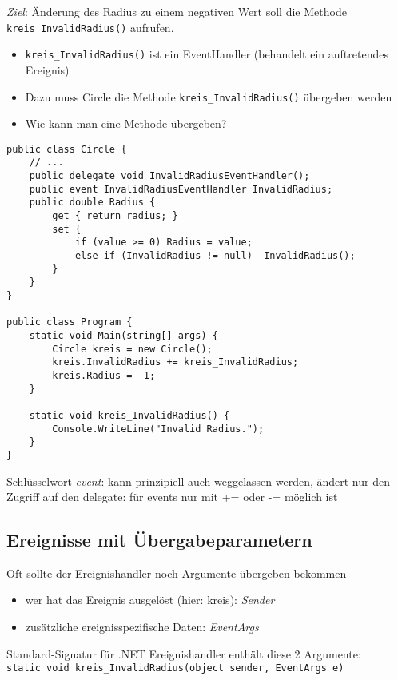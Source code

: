 \emph{Ziel}: Änderung des Radius zu einem negativen Wert soll die Methode \lstinline$kreis_InvalidRadius()$ aufrufen.

\begin{itemize}
\item \lstinline$kreis_InvalidRadius()$ ist ein EventHandler (behandelt ein auftretendes Ereignis)
\item Dazu muss Circle die Methode \lstinline$kreis_InvalidRadius()$ übergeben werden
\item Wie kann man eine Methode übergeben? 
\end{itemize}

\begin{lstlisting}[language={[Sharp]C}]
public class Circle {
	// ...
	public delegate void InvalidRadiusEventHandler();
	public event InvalidRadiusEventHandler InvalidRadius;
	public double Radius {
		get { return radius; }
		set {
			if (value >= 0) Radius = value;
			else if (InvalidRadius != null)  InvalidRadius();
		}
	}
}

public class Program {  
	static void Main(string[] args) {
		Circle kreis = new Circle();
		kreis.InvalidRadius += kreis_InvalidRadius;
		kreis.Radius = -1;
	}

	static void kreis_InvalidRadius() {
		Console.WriteLine("Invalid Radius.");  
	}
}
\end{lstlisting}

Schlüsselwort \emph{event}: kann prinzipiell auch weggelassen werden, ändert nur den Zugriff auf den delegate: für events nur mit += oder -=  möglich ist

\subsection{Ereignisse mit Übergabeparametern}

Oft sollte der Ereignishandler noch Argumente übergeben bekommen
\begin{itemize}
\item wer hat das Ereignis ausgelöst (hier: kreis): \emph{Sender}
\item zusätzliche ereignisspezifische Daten: \emph{EventArgs}
\end{itemize}
Standard-Signatur für .NET Ereignishandler enthält diese 2 Argumente:\\
\lstinline$static void kreis_InvalidRadius(object sender, EventArgs e)$

